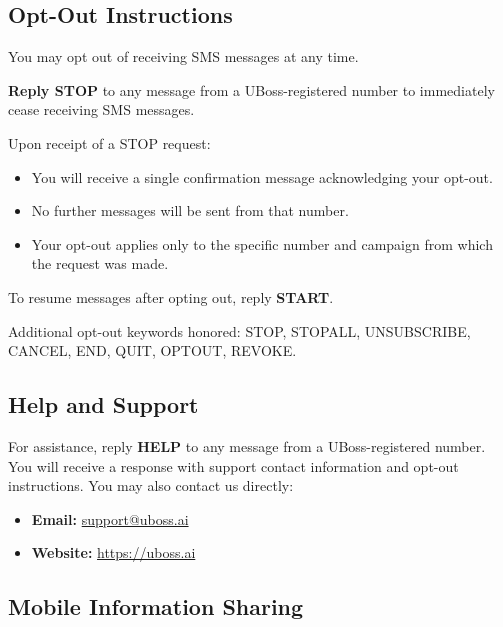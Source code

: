 \documentclass[11pt, letterpaper]{article}
\begin{document}
\subsection{Opt-Out Instructions}

You may opt out of receiving SMS messages at any time.

\begin{tcolorbox}[keywarning, title={How to Opt Out}]
\textbf{Reply STOP} to any message from a UBoss-registered number to immediately
cease receiving SMS messages.
\end{tcolorbox}

Upon receipt of a STOP request:

\begin{itemize}
    \item You will receive a single confirmation message acknowledging your opt-out.
    \item No further messages will be sent from that number.
    \item Your opt-out applies only to the specific number and campaign from which the
          request was made.
\end{itemize}

To resume messages after opting out, reply \textbf{START}.

Additional opt-out keywords honored: STOP, STOPALL, UNSUBSCRIBE, CANCEL, END, QUIT,
OPTOUT, REVOKE.

\subsection{Help and Support}

For assistance, reply \textbf{HELP} to any message from a UBoss-registered number.
You will receive a response with support contact information and opt-out instructions.
You may also contact us directly:

\begin{itemize}
    \item \textbf{Email:} \href{mailto:support@uboss.ai}{support@uboss.ai}
    \item \textbf{Website:} \href{https://uboss.ai}{https://uboss.ai}
\end{itemize}

\subsection{Mobile Information Sharing}
\label{subsec:mobile-sharing}
\end{document}
